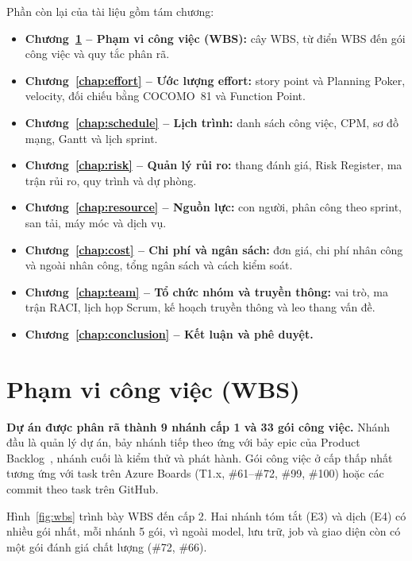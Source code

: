\documentclass[12pt,a4paper]{report}
\begin{document}
Phần còn lại của tài liệu gồm tám chương:
\begin{itemize}
  \item \textbf{Chương~\ref{chap:wbs} -- Phạm vi công việc (WBS):} cây WBS, từ điển WBS đến gói công việc và quy
        tắc phân rã.
  \item \textbf{Chương~\ref{chap:effort} -- Ước lượng effort:} story point và Planning Poker, velocity, đối chiếu
        bằng COCOMO~81 và Function Point.
  \item \textbf{Chương~\ref{chap:schedule} -- Lịch trình:} danh sách công việc, CPM, sơ đồ mạng, Gantt và lịch sprint.
  \item \textbf{Chương~\ref{chap:risk} -- Quản lý rủi ro:} thang đánh giá, Risk Register, ma trận rủi ro, quy trình
        và dự phòng.
  \item \textbf{Chương~\ref{chap:resource} -- Nguồn lực:} con người, phân công theo sprint, san tải, máy móc và
        dịch vụ.
  \item \textbf{Chương~\ref{chap:cost} -- Chi phí và ngân sách:} đơn giá, chi phí nhân công và ngoài nhân công,
        tổng ngân sách và cách kiểm soát.
  \item \textbf{Chương~\ref{chap:team} -- Tổ chức nhóm và truyền thông:} vai trò, ma trận RACI, lịch họp Scrum,
        kế hoạch truyền thông và leo thang vấn đề.
  \item \textbf{Chương~\ref{chap:conclusion} -- Kết luận và phê duyệt.}
\end{itemize}

\chapter{Phạm vi công việc (WBS)}
\label{chap:wbs}

\textbf{Dự án được phân rã thành 9 nhánh cấp 1 và 33 gói công việc.} Nhánh đầu là quản lý dự án, bảy nhánh tiếp
theo ứng với bảy epic của Product Backlog~\cite{srs}, nhánh cuối là kiểm thử và phát hành. Gói công việc ở cấp
thấp nhất tương ứng với task trên Azure Boards (T1.x, \#61--\#72, \#99, \#100) hoặc các commit theo task trên
GitHub.

Hình~\ref{fig:wbs} trình bày WBS đến cấp 2. Hai nhánh tóm tắt (E3) và dịch (E4) có nhiều gói nhất, mỗi nhánh 5
gói, vì ngoài model, lưu trữ, job và giao diện còn có một gói đánh giá chất lượng (\#72, \#66).
\end{document}

